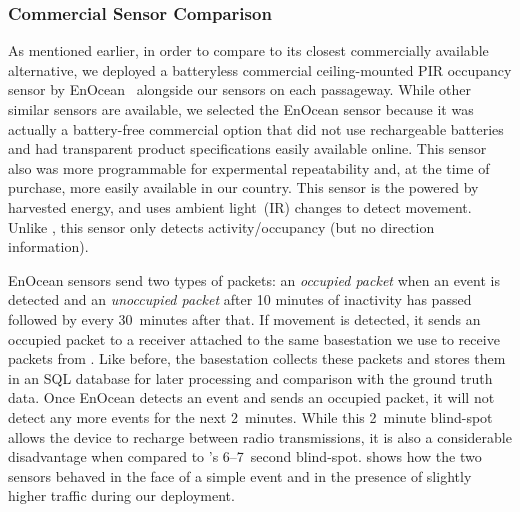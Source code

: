 \subsubsection{Commercial Sensor Comparison}
\label{sec:enocean}
As mentioned earlier, in order to compare \sysname to its closest commercially available alternative, we deployed a batteryless commercial ceiling-mounted PIR occupancy sensor by EnOcean~\cite{EnOcean} alongside our \sysname sensors on each passageway. While other similar sensors are available, we selected the EnOcean sensor because it was actually a battery-free commercial option that did not use rechargeable batteries and had transparent product specifications easily available online.  This sensor also was more programmable for expermental repeatability and, at the time of purchase, more easily available in our country.
This sensor is the powered by harvested energy, and uses ambient light~(IR) changes to detect movement.
Unlike \sysname, this sensor only detects activity/occupancy (but no direction information).


EnOcean sensors send two types of packets: an \emph{occupied packet} when an event is detected and an \emph{unoccupied packet} after 10 minutes of inactivity has passed followed by every 30~minutes after that.  
If movement is detected, it sends an occupied packet to a receiver attached to the same basestation we use to receive packets from \sysname.
Like before, the basestation collects these packets and stores them in an SQL database for later processing and comparison with the ground truth data.
Once EnOcean detects an event and sends an occupied packet, it will not detect any more events for the next 2~minutes. 
While this 2~minute blind-spot allows the device to recharge between radio transmissions, it is also a considerable disadvantage when compared to \sysname's 6--7~second blind-spot.
 shows how the two sensors behaved in the face of a simple event and in the presence of slightly higher traffic during our deployment.


